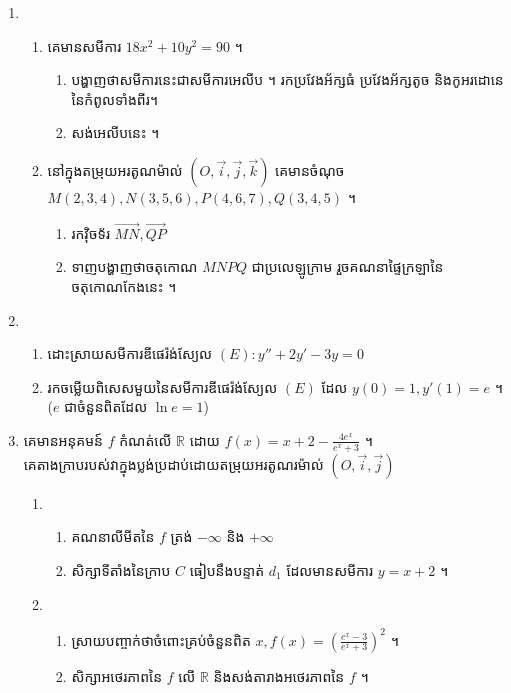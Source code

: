 \documentclass{officialexam}
\begin{document}
\begin{enumerate}[I]
\begin{enumerate}[k]
		\end{enumerate}
		\item \begin{enumerate}[1]
			\item គេមានសមីការ $18x^2+10y^2=90$ ។
			\begin{enumerate}[k]
				\item បង្ហាញថាសមីការនេះជាសមីការអេលីប ។ រកប្រវែងអ័ក្សធំ ប្រវែងអ័ក្សតូច និងកូអរដោនេនៃកំពូលទាំងពីរ។
				\item សង់អេលីបនេះ ។
			\end{enumerate}
			\item នៅក្នុងតម្រុយអរតូណម៉ាល់ $\left(O, \vec{i}, \vec{j}, \vec{k}\right)$ គេមានចំណុច $M\left(2,3,4\right), N\left(3,5,6\right), P\left(4,6,7\right), Q\left(3,4,5\right)$ ។
			\begin{enumerate}[k]
				\item រកវ៉ិចទ័រ $\overrightarrow{MN}, \overrightarrow{QP}$
				\item ទាញបង្ហាញថាចតុកោណ $MNPQ$ ជាប្រលេឡូក្រាម រួចគណនាផ្ទៃក្រឡានៃចតុកោណកែងនេះ ។
			\end{enumerate}
		\end{enumerate}
		\item \begin{enumerate}[k]
			\item ដោះស្រាយសមីការឌីផេរ៉ង់ស្យែល $(E): y''+2y'-3y=0$
			\item រកចម្លើយពិសេសមួយនៃសមីការឌីផេរ៉ង់ស្យែល $(E)$ ដែល $y(0)=1, y'(1)=e$ ។ ($e$ ជាចំនួនពិតដែល $\ln e=1$)
		\end{enumerate}
		\item គេមានអនុគមន៍ $f$ កំណត់លើ $\mathbb{R}$ ដោយ $f(x)=x+2-\frac{4e^x}{e^x+3}$ ។\\
		គេតាងក្រាបរបស់វាក្នុងប្លង់ប្រដាប់ដោយតម្រុយអរតូណរម៉ាល់ $\left(O,\vec{i}, \vec{j}\right)$
		\begin{enumerate}[1]
			\item \begin{enumerate}[k]
				\item គណនាលីមីតនៃ $f$ ត្រង់ $-\infty$ និង $+\infty$
				\item សិក្សាទីតាំងនៃក្រាប $C$ ធៀបនឹងបន្ទាត់ $d_1$ ដែលមានសមីការ $y=x+2$ ។
			\end{enumerate}
			\item \begin{enumerate}[k]
				\item ស្រាយបញ្ចាក់ថាចំពោះគ្រប់ចំនួនពិត $x, f(x)=\left(\frac{e^x-3}{e^x+3}\right)^2$ ។
				\item សិក្សាអថេរភាពនៃ $f$ លើ $\mathbb{R}$ និងសង់តារាងអថេរភាពនៃ $f$ ។

\end{enumerate}
\end{enumerate}
\end{enumerate}
\end{document}
